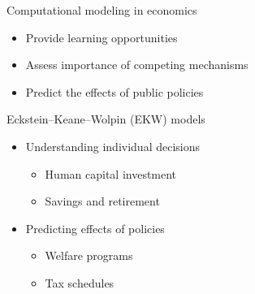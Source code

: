 \begin{frame}{Computational modeling in economics}

\begin{itemize}
\item Provide learning opportunities
\item Assess importance of competing mechanisms
\item Predict the effects of public policies
\end{itemize}

\end{frame}
  \begin{frame}{Eckstein--Keane--Wolpin (EKW) models}

  \begin{itemize}
  	\item Understanding individual decisions
  	\begin{itemize}
  		\item Human capital investment
  		\item Savings and retirement
  	\end{itemize}
  	\item Predicting effects of policies
  	\begin{itemize}
  		\item Welfare programs
  		\item Tax schedules
  	\end{itemize}

  \end{itemize}
  \end{frame}

